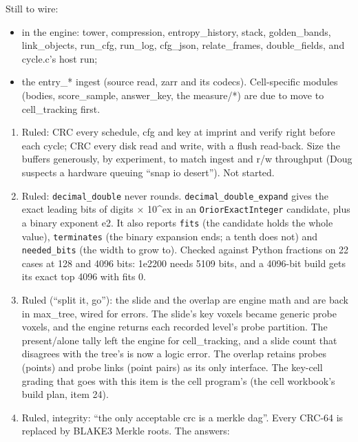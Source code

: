 Still to wire:

\begin{itemize}
\item in the engine: tower, compression, entropy\_\allowbreak{}history, stack, golden\_\allowbreak{}bands, link\_\allowbreak{}objects, run\_\allowbreak{}cfg, run\_\allowbreak{}log, cfg\_\allowbreak{}json, relate\_\allowbreak{}frames, double\_\allowbreak{}fields, and cycle.c's host run;
\item the entry\_\allowbreak{}* ingest (source read, zarr and its codecs). Cell-specific modules (bodies, score\_\allowbreak{}sample, answer\_\allowbreak{}key, the measure/*) are due to move to cell\_\allowbreak{}tracking first.
\end{itemize}

\begin{enumerate}
\item Ruled: CRC every schedule, cfg and key at imprint and verify right before each cycle; CRC every disk read and write, with a flush read-back. Size the buffers generously, by experiment, to match ingest and r/w throughput (Doug suspects a hardware queuing “snap io desert”). Not started.
\item Ruled: \texttt{decimal\_\allowbreak{}double} never rounds. \texttt{decimal\_\allowbreak{}double\_\allowbreak{}expand} gives the exact leading bits of digits × 10\textasciicircum{}ex in an \texttt{Orior\allowbreak{}Exact\allowbreak{}Integer} candidate, plus a binary exponent e2. It also reports \texttt{fits} (the candidate holds the whole value), \texttt{terminates} (the binary expansion ends; a tenth does not) and \texttt{needed\_\allowbreak{}bits} (the width to grow to). Checked against Python fractions on 22 cases at 128 and 4096 bits: 1e2200 needs 5109 bits, and a 4096-bit build gets its exact top 4096 with fits 0.
\item Ruled (“split it, go”): the slide and the overlap are engine math and are back in max\_\allowbreak{}tree, wired for errors. The slide's key voxels became generic probe voxels, and the engine returns each recorded level's probe partition. The present/alone tally left the engine for cell\_\allowbreak{}tracking, and a slide count that disagrees with the tree's is now a logic error. The overlap retains probes (points) and probe links (point pairs) as its only interface. The key-cell grading that goes with this item is the cell program's (the cell workbook's build plan, item 24).
\item Ruled, integrity: “the only acceptable crc is a merkle dag”. Every CRC-64 is replaced by BLAKE3 Merkle roots. The answers:
\end{enumerate}

